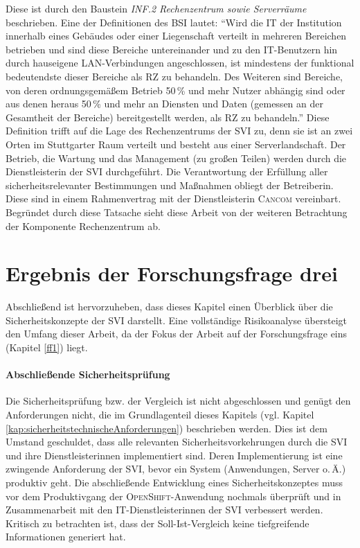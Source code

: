 Diese ist durch den Baustein \textit{INF.2 Rechenzentrum sowie Serverräume} beschrieben. Eine der Definitionen des \ac{BSI} lautet: \enquote{Wird die IT der Institution innerhalb eines Gebäudes oder einer Liegenschaft verteilt in mehreren Bereichen betrieben und sind diese Bereiche untereinander und zu den IT-Benutzern hin durch hauseigene LAN-Verbindungen angeschlossen, ist mindestens der funktional bedeutendste dieser Bereiche als RZ zu behandeln. Des Weiteren sind Bereiche, von deren ordnungsgemäßem Betrieb 50\,\% und mehr Nutzer abhängig sind oder aus denen heraus 50\,\% und mehr an Diensten und Daten (gemessen an der Gesamtheit der Bereiche) bereitgestellt werden, als RZ zu behandeln.}\autocite[][S.\,755]{bundesamt_fur_sicherheit_in_der_informationstechnik_bsi_it-grundschutz-kompendium_2020} Diese Definition trifft auf die Lage des Rechenzentrums der \ac{SVI} zu, denn sie ist an zwei Orten im Stuttgarter Raum verteilt und besteht aus einer Serverlandschaft. Der Betrieb, die Wartung und das Management (zu großen Teilen) werden durch die Dienstleisterin der \ac{SVI} durchgeführt. Die Verantwortung der Erfüllung aller sicherheitsrelevanter Bestimmungen und Maßnahmen obliegt der Betreiberin. Diese sind in einem Rahmenvertrag mit der Dienstleisterin \textsc{Cancom} vereinbart. Begründet durch diese Tatsache sieht diese Arbeit von der weiteren Betrachtung der Komponente Rechenzentrum ab.

\section{Ergebnis der Forschungsfrage drei}
Abschließend ist hervorzuheben, dass dieses Kapitel einen Überblick über die Sicherheitskonzepte der \ac{SVI} darstellt. Eine vollständige Risikoanalyse übersteigt den Umfang dieser Arbeit, da der Fokus der Arbeit auf der Forschungsfrage eins (Kapitel \vref{ff1}) liegt. 

\paragraph{Abschließende Sicherheitsprüfung} Die Sicherheitsprüfung bzw. der Vergleich ist nicht abgeschlossen und genügt den Anforderungen nicht, die im Grundlagenteil dieses Kapitels (vgl. Kapitel \vref{kap:sicherheitstechnischeAnforderungen}) beschrieben werden. Dies ist dem Umstand geschuldet, dass alle relevanten Sicherheitsvorkehrungen durch die \ac{SVI} und ihre Dienstleisterinnen implementiert sind. Deren Implementierung ist eine zwingende Anforderung der \ac{SVI}, bevor ein System (Anwendungen, Server o.\,Ä.) produktiv geht. Die abschließende Entwicklung eines Sicherheitskonzeptes muss vor dem Produktivgang der \textsc{OpenShift}-Anwendung nochmals überprüft und in Zusammenarbeit mit den IT-Dienstleisterinnen der \ac{SVI} verbessert werden. Kritisch zu betrachten ist, dass der Soll-Ist-Vergleich keine tiefgreifende Informationen generiert hat. 

